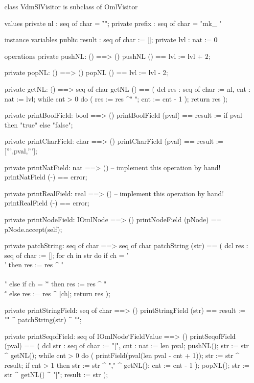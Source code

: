 \begin{vdm_al}
class VdmSlVisitor is subclass of OmlVisitor

values
  private nl : seq of char = "\r\n";
  private prefix : seq of char = "mk_ "

instance variables
  public result : seq of char := [];
  private lvl : nat := 0

operations
  private pushNL: () ==> ()
  pushNL () == lvl := lvl + 2;

  private popNL: () ==> ()
  popNL () == lvl := lvl - 2;

  private getNL: () ==> seq of char
  getNL () ==
    ( dcl res : seq of char := nl, cnt : nat := lvl;
      while cnt > 0 do ( res := res ^" "; cnt := cnt - 1 );
      return res );

  private printBoolField: bool ==> ()
  printBoolField (pval) ==
    result := if pval then "true" else "false";

  private printCharField: char ==> ()
  printCharField (pval) ==
    result := [''',pval,'''];

  private printNatField: nat ==> ()
  -- implement this operation by hand!
  printNatField (-) == error;

  private printRealField: real ==> ()
  -- implement this operation by hand!
  printRealField (-) == error;

  private printNodeField: IOmlNode ==> ()
  printNodeField (pNode) == pNode.accept(self);

  private patchString: seq of char ==> seq of char
  patchString (str) ==
   ( dcl res : seq of char := [];
     for ch in str do
       if ch = '\\' then res := res ^ "\\\\"
       else if ch = '\"' then res := res ^ "\\\""
       else res := res ^ [ch];
     return res );

  private printStringField: seq of char ==> ()
  printStringField (str) == result := "\"" ^ patchString(str) ^ "\"";

  private printSeqofField: seq of IOmlNode`FieldValue ==> ()
  printSeqofField (pval) ==
    ( dcl str : seq of char := "[", cnt : nat := len pval;
      pushNL();
      str := str ^ getNL();
      while cnt > 0 do
        ( printField(pval(len pval - cnt + 1));
          str := str ^ result;
          if cnt > 1
          then str := str ^ "," ^ getNL();
          cnt := cnt - 1 ); 
      popNL();
      str := str ^ getNL() ^ "]";
      result := str );


\end{vdm_al}
